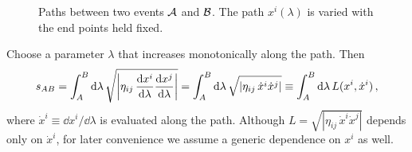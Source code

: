 \begin{figure}[H]
    \centering
    \caption{Paths between two events $\mathcal{A}$ and $\mathcal{B}$. The path $x^i(\lambda)$ is varied
        with the end points held fixed.}
    \label{fig:geodesic_paths}
\end{figure}

Choose a parameter $\lambda$ that increases monotonically along the path. Then
\begin{equation}
    s_{AB} = \int_A^B \mathrm{d}\lambda\, \sqrt{\left| \eta_{ij}\, \frac{\mathrm{d} x^i}{\mathrm{d} \lambda} \frac{\mathrm{d} x^j}{\mathrm{d} \lambda} \right|}
    = \int_A^B \mathrm{d}\lambda\, \sqrt{\left| \eta_{ij}\, \dot{x}^i \dot{x}^j \right|}
    \equiv \int_A^B \mathrm{d}\lambda\, L(x^i, \dot{x}^i) \, ,
    \label{eq:path_length}
\end{equation}
where $\dot{x}^i \equiv \dd x^i / \dd\lambda$ is evaluated along the path.
Although $L = \sqrt{|\eta_{ij}\, \dot{x}^i \dot{x}^j|}$ depends only on $\dot{x}^i$, for later
convenience we assume a generic dependence on $x^i$ as well.

